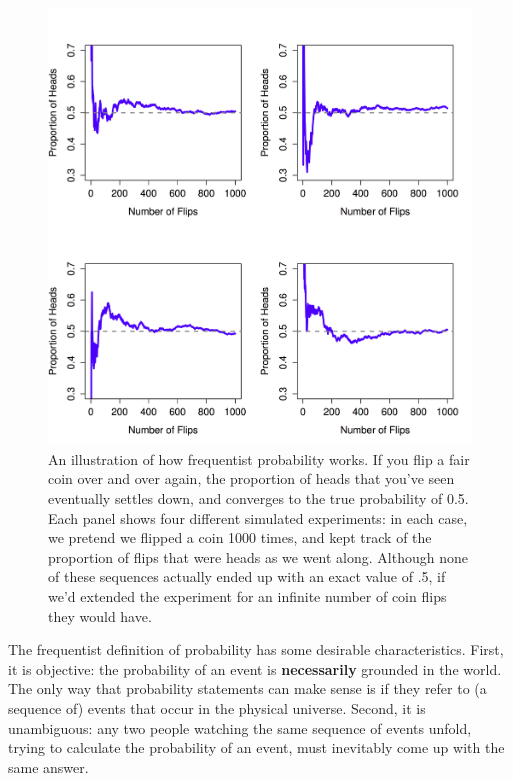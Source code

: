 \documentclass[]{book}
\begin{document}
\begin{figure}
\centering
\includegraphics{navarro_img/probability/frequentistProb-eps-converted-to.png}
\caption{\label{fig:4FreqProb}An illustration of how frequentist probability works. If you flip a fair coin over and over again, the proportion of heads that you've seen eventually settles down, and converges to the true probability of 0.5. Each panel shows four different simulated experiments: in each case, we pretend we flipped a coin 1000 times, and kept track of the proportion of flips that were heads as we went along. Although none of these sequences actually ended up with an exact value of .5, if we'd extended the experiment for an infinite number of coin flips they would have.}
\end{figure}

The frequentist definition of probability has some desirable characteristics. First, it is objective: the probability of an event is \textbf{necessarily} grounded in the world. The only way that probability statements can make sense is if they refer to (a sequence of) events that occur in the physical universe. Second, it is unambiguous: any two people watching the same sequence of events unfold, trying to calculate the probability of an event, must inevitably come up with the same answer.
\end{document}
